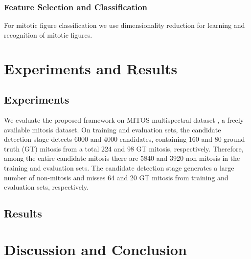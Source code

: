 \documentclass[10pt,twocolumn,letterpaper]{article}
\begin{document}
\subsubsection{Feature Selection and Classification}
For mitotic figure classification we use dimensionality reduction for learning and recognition of mitotic figures. 
\section{Experiments and Results}
\label{sec:results}
\subsection{Experiments}
We evaluate the proposed framework on MITOS multispectral dataset \cite{mITOS2012}, a freely available mitosis dataset. On training and evaluation sets, the candidate detection stage detects 6000 and 4000 candidates, containing 160 and 80 ground-truth (GT) mitosis from a total 224 and 98 GT mitosis, respectively. Therefore, among the entire candidate mitosis there are 5840 and 3920 non mitosis in the training and evaluation sets. The candidate detection stage generates a large number of non-mitosis and misses 64 and 20 GT mitosis from training and evaluation sets, respectively. 
\subsection{Results}

\section{Discussion and Conclusion}
\label{sec:conclusion}

{\small


}
\end{document}
